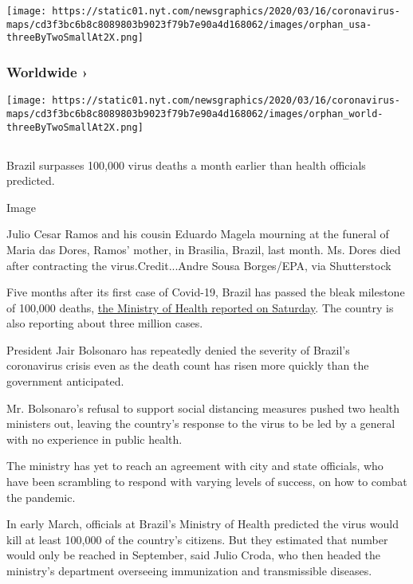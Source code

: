 \texttt{[image: https://static01.nyt.com/newsgraphics/2020/03/16/coronavirus-maps/cd3f3bc6b8c8089803b9023f79b7e90a4d168062/images/orphan\_usa-threeByTwoSmallAt2X.png]}
\href{https://www.nytimes.com/interactive/2020/world/coronavirus-maps.html}{}

\hypertarget{worldwide-}{%
\subsubsection{Worldwide ›}\label{worldwide-}}

\texttt{[image: https://static01.nyt.com/newsgraphics/2020/03/16/coronavirus-maps/cd3f3bc6b8c8089803b9023f79b7e90a4d168062/images/orphan\_world-threeByTwoSmallAt2X.png]}

\hypertarget{section-2}{%
\subsection{}\label{section-2}}

Brazil surpasses 100,000 virus deaths a month earlier than health
officials predicted.

Image

Julio Cesar Ramos and his cousin Eduardo Magela mourning at the funeral
of Maria das Dores, Ramos' mother, in Brasilia, Brazil, last month. Ms.
Dores died after contracting the virus.Credit...Andre Sousa Borges/EPA,
via Shutterstock

Five months after its first case of Covid-19, Brazil has passed the
bleak milestone of 100,000 deaths,
\href{https://covid.saude.gov.br/}{the Ministry of Health reported on
Saturday}. The country is also reporting about three million cases.

President Jair Bolsonaro has repeatedly denied the severity of Brazil's
coronavirus crisis even as the death count has risen more quickly than
the government anticipated.

Mr. Bolsonaro's refusal to support social distancing measures pushed two
health ministers out, leaving the country's response to the virus to be
led by a general with no experience in public health.

The ministry has yet to reach an agreement with city and state
officials, who have been scrambling to respond with varying levels of
success, on how to combat the pandemic.

In early March, officials at Brazil's Ministry of Health predicted the
virus would kill at least 100,000 of the country's citizens. But they
estimated that number would only be reached in September, said Julio
Croda, who then headed the ministry's department overseeing immunization
and transmissible diseases.

